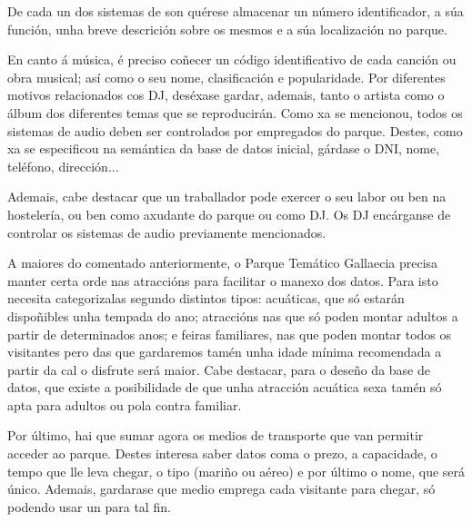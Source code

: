 \documentclass[12pt,a4paper]{book}
\theoremstyle{definition}
\theoremstyle{break}
\begin{document}
De cada un dos sistemas de son quérese almacenar un número identificador, a súa función, unha breve descrición sobre os mesmos e a súa localización no
parque.

En canto á música, é preciso coñecer un código identificativo de cada canción
ou obra musical; así como o seu nome, clasificación e popularidade. Por diferentes motivos relacionados cos DJ, deséxase gardar, ademais, tanto o artista como o
álbum dos diferentes temas que se reproducirán.
Como xa se mencionou, todos os sistemas de audio deben ser controlados por empregados
do parque. Destes, como xa se especificou na semántica da base de datos
inicial, gárdase o DNI, nome, teléfono, dirección...

Ademais, cabe destacar que un traballador pode exercer o seu labor ou ben na
hostelería, ou ben como axudante do parque ou como DJ. Os DJ encárganse de controlar
os sistemas de audio previamente mencionados.

A maiores do comentado anteriormente, o Parque Temático {\logo Gallaecia} precisa
manter certa orde nas atraccións para facilitar o manexo dos datos. Para isto necesita categorizalas segundo distintos tipos: acuáticas, que só estarán dispoñibles unha
tempada do ano; atraccións nas que só poden montar adultos a partir de determinados anos; e feiras familiares, nas que poden montar todos os visitantes pero das
que gardaremos tamén unha idade mínima recomendada a partir da cal o disfrute
será maior. Cabe destacar, para o deseño da base de datos, que existe a posibilidade
de que unha atracción acuática sexa tamén só apta para adultos ou pola contra
familiar.

Por último, hai que sumar agora os medios de transporte que
van permitir acceder ao parque. Destes interesa saber datos coma o prezo, a
capacidade, o tempo que lle leva chegar, o tipo (mariño ou aéreo) e por último o
nome, que será único.
Ademais, gardarase que medio emprega cada visitante para chegar, só podendo
usar un para tal fin.
\end{document}
